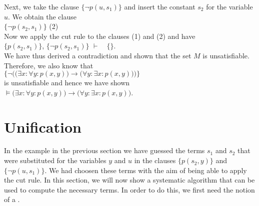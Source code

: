 Next, we take the clause $\big\{\neg p(u,s_1)\big\}$ and
insert the constant $s_2$ for the variable $u$.  We obtain the 
clause \\[0.2cm]
\hspace*{1.3cm} $\big\{\neg p(s_2,s_1)\big\}$ \hspace*{\fill} (2) \\[0.2cm]
Now we apply the cut rule to the clauses (1) and (2) and have \\[0.2cm]
\hspace*{1.3cm} 
$\big\{ p(s_2,s_1) \big\}$, \quad$\big\{\neg p(s_2,s_1)\big\}$ \quad $\vdash \quad \{\}$.
\\[0.2cm]
We have thus derived a contradiction and shown that the set $M$ is unsatisfiable.  Therefore, we also know that
\\[0.2cm]
\hspace*{1.3cm} 
$\Big\{ \neg \Big(\big(\exists x\colon \forall y\colon  p(x,y)\big) \rightarrow  \big(\forall y\colon \exists x\colon p(x,y)\big)\Big)\Big\}$
\\[0.2cm]
is unsatisfiable and hence we have shown \\[0.2cm]
\hspace*{1.3cm} 
$\models \big(\exists x\colon \forall y\colon  p(x,y)\big) \rightarrow  \big(\forall y\colon \exists x\colon p(x,y)\big)$.

\section{Unification}
In the example in the previous section we have guessed the terms $s_1$ and $s_2$ that were substituted for
the variables $y$ and $u$ in the clauses $\big\{ p(s_2,y) \big\}$ and $\big\{\neg p(u,s_1)\big\}$.
We had choosen these terms with the aim of being able to apply the cut rule.
In this section, we will now show a systematic algorithm that can be used to compute the necessary terms.
In order to do this, we first need the notion of a .

